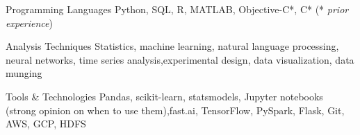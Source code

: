 
\begin{cvskills}

  \cvskill
    {Programming Languages} %
    {Python, SQL, R, MATLAB, Objective-C*, C* (* \textit{prior experience})} %

  \cvskill
    {Analysis Techniques} %
    {Statistics, machine learning, natural language processing, neural networks, time series analysis,\newline experimental design, data visualization, data munging} %

  \cvskill
    {Tools \& Technologies} %
    {Pandas, scikit-learn, statsmodels, Jupyter notebooks (strong opinion on when to use them),\newline fast.ai, TensorFlow, PySpark, Flask, Git, AWS, GCP, HDFS} %


\end{cvskills}
